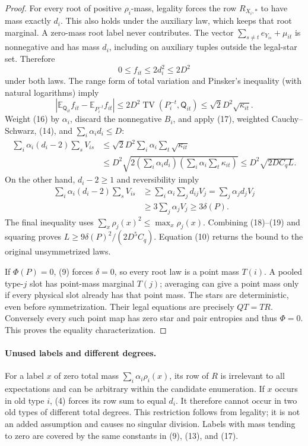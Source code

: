 \documentclass[11pt]{article}
\newcommand{\TV}{\operatorname{TV}}
\newcommand{\E}{\mathbb E}
\begin{document}
\begin{proof}
For every root of positive $\rho_i$-mass, legality forces the row
$R_{X_i,*}$ to have mass exactly $d_i$. This also holds under the
auxiliary law, which keeps that root marginal. A zero-mass root label
never contributes. The vector $\sum_{s\ne t}e_{Y_{is}}+\mu_{it}$ is
nonnegative and has mass $d_i$, including on auxiliary tuples outside
the legal-star set. Therefore
\[
 0\leq f_{it}\leq2d_i^2\leq2D^2
\]
under both laws. The range form of total variation and Pinsker's
inequality (with natural logarithms) imply
\[
 \left|\E_{\mathsf Q_{it}}f_{it}-\E_{P_i^{-t}}f_{it}\right|
       \leq2D^2\TV(P_i^{-t},\mathsf Q_{it})
       \leq\sqrt2D^2\sqrt{\kappa_{it}}.            \tag{17}
\]
Weight (16) by $\alpha_i$, discard the nonnegative $B_i$, and apply
(17), weighted Cauchy--Schwarz, (14), and $\sum_i\alpha_id_i\leq D$:
\begin{align}
 \sum_i\alpha_i(d_i-2)\sum_sV_{is}
 &\leq\sqrt2D^2\sum_i\alpha_i\sum_t\sqrt{\kappa_{it}}\nonumber\\
 &\leq D^2\sqrt{2\left(\sum_i\alpha_id_i\right)
                         \left(\sum_i\alpha_i\sum_t\kappa_{it}\right)}
 \leq D^2\sqrt{2D C_qL}.                          \tag{18}
\end{align}
On the other hand, $d_i-2\geq1$ and reversibility imply
\begin{align}
 \sum_i\alpha_i(d_i-2)\sum_sV_{is}
 &\geq\sum_i\alpha_i\sum_jd_{ij}V_j
   =\sum_j\alpha_jd_jV_j\nonumber\\
 &\geq3\sum_j\alpha_jV_j\geq3\delta(P).             \tag{19}
\end{align}
The final inequality uses $\sum_x\rho_j(x)^2\leq\max_x\rho_j(x)$.
Combining (18)--(19) and squaring proves
$L\geq9\delta(P)^2/(2D^5C_q)$. Equation (10) returns the bound to
the original unsymmetrized laws.

If $\Phi(P)=0$, (9) forces $\delta=0$, so every root law is a point
mass $T(i)$. A pooled type-$j$ slot has point-mass marginal $T(j)$;
averaging can give a point mass only if every physical slot already
has that point mass. The stars are deterministic, even before
symmetrization. Their legal equations are precisely $QT=TR$.
Conversely every such point map has zero star and pair entropies and
thus $\Phi=0$. This proves the equality characterization.
\end{proof}

\paragraph{Unused labels and different degrees.}
For a label $x$ of zero total mass $\sum_i\alpha_i\rho_i(x)$, its
row of $R$ is irrelevant to all expectations and can be arbitrary
within the candidate enumeration. If $x$ occurs in old type $i$,
(4) forces its row sum to equal $d_i$. It therefore cannot occur in
two old types of different total degrees. This restriction follows
from legality; it is not an added assumption and causes no singular
division. Labels with mass tending to zero are covered by the same
constants in (9), (13), and (17).
\end{document}

